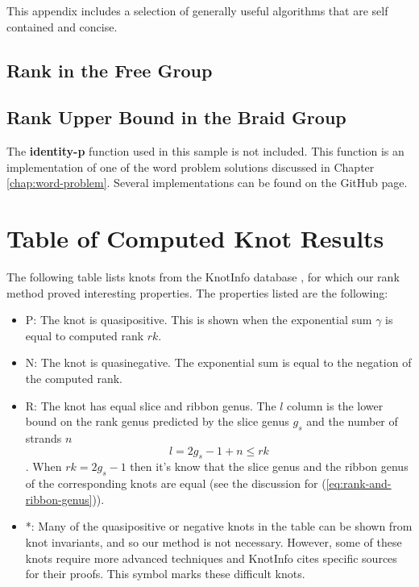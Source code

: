\documentclass[12pt]{thesis}
\begin{document}
This appendix includes a selection of generally useful algorithms
that are self contained and concise.

\section{Rank in the Free Group}

\label{free-rank-code}

\begin{singlespace}
    
\end{singlespace}

\section{Rank Upper Bound in the Braid Group}

The \textbf{identity-p} function used in this sample
is not included.
This function is an implementation of one of the word problem solutions
discussed in Chapter \ref{chap:word-problem}.
Several implementations can be found on the GitHub page.

\label{braid-rank-code}

\begin{singlespace}
    
\end{singlespace}

\chapter{Table of Computed Knot Results}

\label{knotinfo-table} 

The following table lists knots from the KnotInfo 
database \cite{knotinfo},
for which our rank method proved interesting properties.
The properties listed are the following:
\begin{itemize}
    \item P: The knot is quasipositive. This is shown when the exponential sum $\gamma$ is equal to computed rank $rk$.
    \item N: The knot is quasinegative. The exponential sum is equal to the negation of the computed rank.
    \item R: The knot has equal slice and ribbon genus.
        The $l$ column is the lower bound on the rank
        genus predicted by the slice genus $g_{s}$ and the number of strands $n$
        \[
            l = 2g_{s} - 1 + n \leq rk
        \].
        When $rk = 2g_{s} - 1$ then it's know that the slice genus
        and the ribbon genus of the corresponding knots are equal
        (see the discussion for (\ref{eq:rank-and-ribbon-genus})).

   \item *: Many of the quasipositive or negative knots in the table can be shown from knot invariants,
            and so our method is not necessary.
            However, some of these knots require more advanced techniques
            and KnotInfo cites specific sources for their proofs.
            This symbol marks these difficult knots.

\end{itemize}
\end{document}
